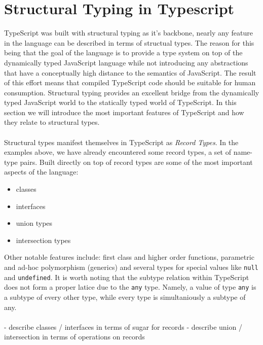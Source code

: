 \section{Structural Typing in Typescript}
\label{sec:structural-typing-typescript}
TypeScript was built with structural typing as it's backbone, 
nearly any feature in the language can be described in terms of structual types.
The reason for this being that the goal of the language is to provide a type system
on top of the dynamically typed JavaScript language while not introducing any 
abstractions that have a conceptually high distance to the semantics of JavaScript.
The result of this effort means that compiled TypeScript code should be suitable 
for human consumption. Structural typing provides an excellent bridge from the 
dynamically typed JavaScript world to the statically typed world of TypeScript.
In this section we will introduce the most important features of TypeScript and
how they relate to structural types.
\\
\\
Structural types manifest themselves in TypeScript as \textit{Record Types}.
In the examples above, we have already encountered some record types, a set of name-type pairs.
Built directly on top of record types are some of the most important aspects of the language:
\begin{itemize}
\item classes
\item interfaces
\item union types
\item intersection types
\end{itemize}

Other notable features include: first class and higher order functions, parametric and ad-hoc polymorphism 
(generics) and several types for special values like \texttt{null} and \texttt{undefined}. It is 
worth noting that the subtype relation within TypeScript does not form a proper latice due to 
the \texttt{any} type. Namely, a value of type \texttt{any} is a subtype of every other type, 
while every type is simultaniously a subtype of any.
\\
\\
- describe classes / interfaces in terms of sugar for records
- describe union / intersection in terms of operations on records
